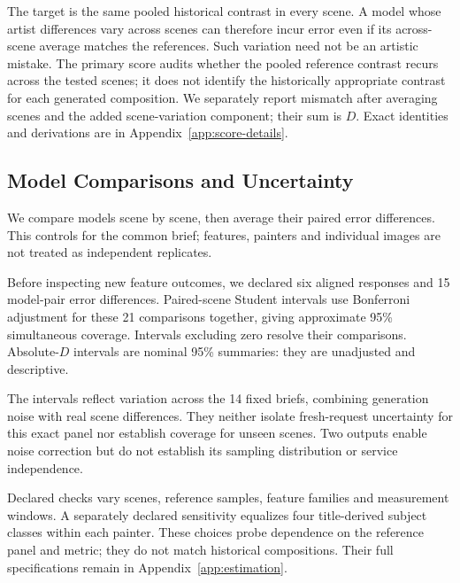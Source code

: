 The target is the same pooled historical contrast in every scene. A model
whose artist differences vary across scenes can therefore incur error even
if its across-scene average matches the references. Such variation need not
be an artistic mistake. The primary score audits whether the pooled reference
contrast recurs across the tested scenes; it does not identify the historically
appropriate contrast for each generated composition. We separately report mismatch after averaging scenes
and the added scene-variation component; their sum is $D$. Exact identities
and derivations are in Appendix~\ref{app:score-details}.

\subsection{Model Comparisons and Uncertainty}
We compare models scene by scene, then average their paired error differences.
This controls for the common brief; features, painters and individual images
are not treated as independent replicates.

Before inspecting new feature outcomes, we declared six aligned responses and
15 model-pair error differences. Paired-scene Student intervals use Bonferroni
adjustment for these 21 comparisons together, giving approximate 95\%
simultaneous coverage. Intervals excluding zero resolve their comparisons.
Absolute-$D$ intervals are nominal 95\% summaries: they are unadjusted and descriptive.

The intervals reflect variation across the 14 fixed briefs, combining generation
noise with real scene differences. They neither isolate fresh-request uncertainty for this exact
panel nor establish coverage for unseen scenes. Two outputs enable noise
correction but do not establish its sampling distribution or service independence.

Declared checks vary scenes, reference samples, feature families and measurement
windows. A separately declared sensitivity equalizes four title-derived subject
classes within each painter. These choices probe dependence on the reference
panel and metric; they do not match historical compositions. Their full
specifications remain in Appendix~\ref{app:estimation}.

